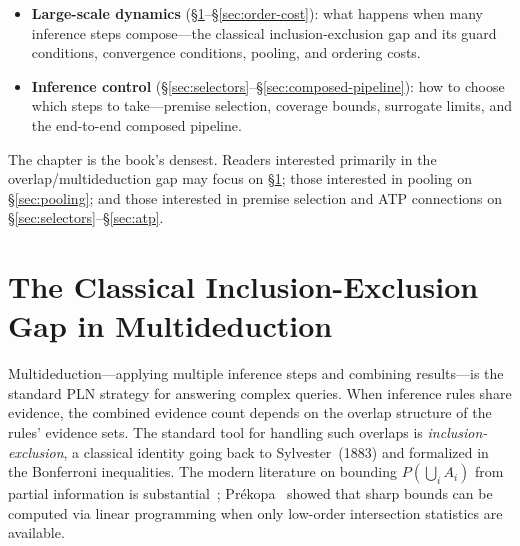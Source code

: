 \documentclass[11pt,openany]{report}
\begin{document}
\begin{itemize}
\item \textbf{Large-scale dynamics} (\S\ref{sec:multideduction}--\S\ref{sec:order-cost}): what happens when
  many inference steps compose---the classical inclusion-exclusion
  gap and its guard conditions,
  convergence conditions, pooling, and ordering costs.
\item \textbf{Inference control}
  (\S\ref{sec:selectors}--\S\ref{sec:composed-pipeline}): how to
  choose which steps to take---premise selection, coverage bounds,
  surrogate limits, and the end-to-end composed pipeline.
\end{itemize}

\noindent
The chapter is the book's densest.  Readers interested primarily
in the overlap/multideduction gap may focus on
\S\ref{sec:multideduction}; those interested in pooling on
\S\ref{sec:pooling}; and those interested in premise selection
and ATP connections on \S\ref{sec:selectors}--\S\ref{sec:atp}.




\section{The Classical Inclusion-Exclusion Gap in Multideduction}
\label{sec:multideduction}

Multideduction---applying multiple inference steps and combining
results---is the standard PLN strategy for answering complex queries.
When inference rules share evidence, the combined evidence count
depends on the overlap structure of the rules' evidence sets.  The
standard tool for handling such overlaps is
\emph{inclusion-exclusion}, a classical identity going back to
Sylvester~(1883) and formalized in the Bonferroni inequalities.
The modern literature on bounding $P(\bigcup_i A_i)$ from partial
information is substantial~\cite{Hunter1976, KouniasSotirakoglou1989,
YangAlajaji2017}; Pr{\'e}kopa~\cite{Prekopa1988} showed that sharp
bounds can be computed via linear programming when only low-order
intersection statistics are available.
\end{document}
